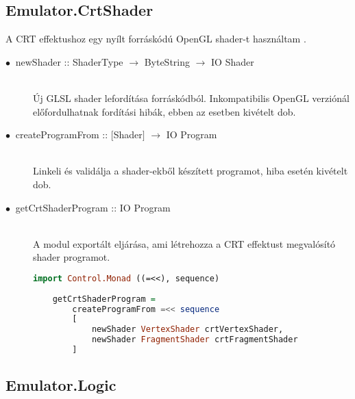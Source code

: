 \subsection{Emulator.CrtShader}

A CRT effektushoz egy nyílt forráskódú OpenGL shader-t használtam \cite{crtshader}.

\begin{description}
	\item[$\bullet\:$ newShader :: ShaderType $\rightarrow$ ByteString $\rightarrow$ IO Shader] \hfill \\
	Új GLSL shader lefordítása forráskódból. Inkompatibilis OpenGL verziónál előfordulhatnak fordítási hibák, ebben az esetben kivételt dob.
	\item[$\bullet\:$ createProgramFrom :: $\lbrack$Shader$\rbrack$ $\rightarrow$ IO Program] \hfill \\
	Linkeli és validálja a shader-ekből készített programot, hiba esetén kivételt dob.
	\item[$\bullet\:$ getCrtShaderProgram :: IO Program] \hfill \\
	A modul exportált eljárása, ami létrehozza a CRT effektust megvalósító shader programot.
	
	\begin{lstlisting}[language=Haskell]
	import Control.Monad ((=<<), sequence)
	
	getCrtShaderProgram = 
		createProgramFrom =<< sequence 
		[
			newShader VertexShader crtVertexShader, 
			newShader FragmentShader crtFragmentShader
		]
	\end{lstlisting}
\end{description}

\subsection{Emulator.Logic}

